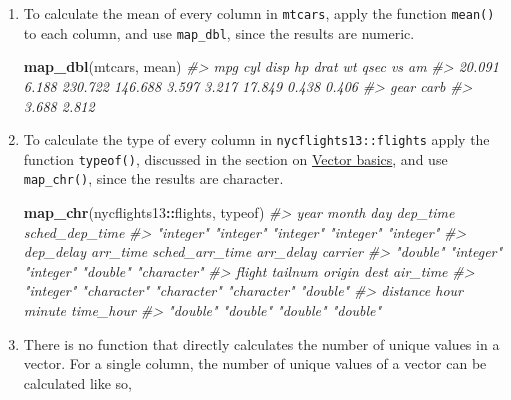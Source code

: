 \documentclass[]{book}
\newenvironment{Shaded}{\begin{snugshade}}{\end{snugshade}}
\newcommand{\CommentTok}[1]{\textcolor[rgb]{0.56,0.35,0.01}{\textit{#1}}}
\newcommand{\KeywordTok}[1]{\textcolor[rgb]{0.13,0.29,0.53}{\textbf{#1}}}
\newcommand{\NormalTok}[1]{#1}
\newcommand{\OperatorTok}[1]{\textcolor[rgb]{0.81,0.36,0.00}{\textbf{#1}}}
\theoremstyle{plain}
\theoremstyle{remark}
\begin{document}
\begin{enumerate}
\def\labelenumi{\arabic{enumi}.}
\item
  To calculate the mean of every column in \texttt{mtcars}, apply the function
  \texttt{mean()} to each column, and use \texttt{map\_dbl}, since the results are numeric.

\begin{Shaded}
\begin{Highlighting}[]
\KeywordTok{map_dbl}\NormalTok{(mtcars, mean)}
\CommentTok{#>     mpg     cyl    disp      hp    drat      wt    qsec      vs      am }
\CommentTok{#>  20.091   6.188 230.722 146.688   3.597   3.217  17.849   0.438   0.406 }
\CommentTok{#>    gear    carb }
\CommentTok{#>   3.688   2.812}
\end{Highlighting}
\end{Shaded}
\item
  To calculate the type of every column in \texttt{nycflights13::flights} apply
  the function \texttt{typeof()}, discussed in the section on \href{http://r4ds.had.co.nz/vectors.html\#vector-basics}{Vector basics},
  and use \texttt{map\_chr()}, since the results are character.

\begin{Shaded}
\begin{Highlighting}[]
\KeywordTok{map_chr}\NormalTok{(nycflights13}\OperatorTok{::}\NormalTok{flights, typeof)}
\CommentTok{#>           year          month            day       dep_time sched_dep_time }
\CommentTok{#>      "integer"      "integer"      "integer"      "integer"      "integer" }
\CommentTok{#>      dep_delay       arr_time sched_arr_time      arr_delay        carrier }
\CommentTok{#>       "double"      "integer"      "integer"       "double"    "character" }
\CommentTok{#>         flight        tailnum         origin           dest       air_time }
\CommentTok{#>      "integer"    "character"    "character"    "character"       "double" }
\CommentTok{#>       distance           hour         minute      time_hour }
\CommentTok{#>       "double"       "double"       "double"       "double"}
\end{Highlighting}
\end{Shaded}
\item
  There is no function that directly calculates the number of unique values
  in a vector. For a single column, the number of unique values of a vector
  can be calculated like so,

\begin{Shaded}
\end{Shaded}


\end{enumerate}
\end{document}

